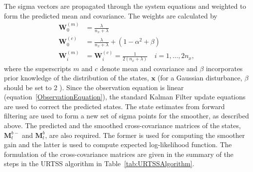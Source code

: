 \documentclass[]{article}
\begin{document}
The sigma vectors are propagated through the system equations and weighted to form the predicted mean and covariance. The weights are calculated by 
\begin{align}
	\mathbf W_0^{(m)}&=\frac{\lambda}{ n_x+\lambda} \\
	\mathbf W_0^{(c)}&=\frac{\lambda}{ n_x+\lambda}+(1-\alpha^2+\beta) \\
	\mathbf W_i^{(m)}&=\mathbf W_i^{(c)}=\frac{1}{2( n_x+\lambda)} \quad i=1, \dots, 2n_x, 
\end{align}
where the superscripts $m$ and $c$ denote mean and covariance and $\beta$ incorporates prior knowledge of the distribution of the states, $\mathbf{x}$ (for a Gaussian disturbance, $\beta$ should be set to 2 \cite{Haykin2001}). Since the observation equation is linear (equation~\ref{ObservationEquation}), the standard Kalman Filter update equations are used to correct the predicted states. The state estimates from forward filtering are used to form a new set of sigma points for the smoother, as described above. The predicted and the smoothed cross-covariance matrices of the states, $\mathbf M_{t}^{b-}$ and  $\mathbf M_{t}^{b}$, are also required. The former is used  for computing the smoother gain and the latter is used to compute expected log-likelihood function. The formulation of the cross-covariance matrices are given in the summary of the steps in the URTSS algorithm in Table~\ref{tab:URTSSAlgorithm}. 
\end{document}
